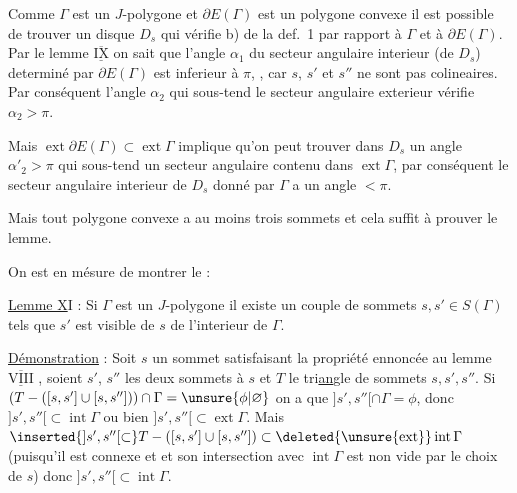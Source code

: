 Comme $\Gamma$ est un $J$-polygone et $\partial E(\Gamma)$ est un polygone convexe il est possible de trouver un disque $D_s$ qui vérifie b) de la def.~1 par rapport à $\Gamma$ et à $\partial E(\Gamma)$. Par le lemme $\underline{\overline{\mathrm{IX}}}$ on sait que l'angle $\alpha_1$ du secteur angulaire interieur (de $D_s$) determiné par $\partial E(\Gamma)$ est inferieur à $\pi$, , car $s$, $s'$ et $s''$ ne sont pas colineaires. Par conséquent l'angle $\alpha_2$ qui sous-tend le secteur angulaire exterieur vérifie $\alpha_2>\pi$.

Mais $\operatorname{ext}\partial E(\Gamma)\subset\operatorname{ext}\Gamma$ implique qu'on peut trouver dans $D_s$ un angle $\alpha'_2>\pi$ qui sous-tend un secteur angulaire contenu dans $\operatorname{ext}\Gamma$, par conséquent le secteur angulaire interieur de $D_s$  donné par $\Gamma$ a un angle $<\pi$.

Mais tout polygone convexe a au moins trois sommets et cela suffit à prouver le lemme.

On est en mésure de montrer le :

\uline{Lemme X}I : Si $\Gamma$ est un $J$-polygone  il existe un couple de sommets $s,s'\in S(\Gamma)$ tels que $s'$ est visible de $s$ de l'interieur de $\Gamma$.


\uline{Démonstration} : Soit $s$ un sommet satisfaisant la propriété ennoncée au lemme $\underline{\overline{\mathrm{VIII}}}$%
, soient $s'$, $s''$ les deux sommets   à $s$ et $T$ le tri\uline{an}gle%
 de sommets $s,s',s''$. Si $(T-([s,s']\cup[s,s'']))\cap\Gamma=\unsure{\phi|\varnothing}$ on a que $]s',s''[\cap\Gamma=\phi$, donc $]s',s''[\subset\operatorname{int}\Gamma$ ou bien $]s',s''[\subset\operatorname{ext}\Gamma$. Mais $\inserted{]s',s''[\subset}T-([s,s']\cup[s,s''])\subset\deleted{\unsure{\operatorname{ext}}}\operatorname{int}\Gamma$ (puisqu'il est connexe et et son intersection avec $\operatorname{int}\Gamma$ est non vide par le choix de $s$) donc $]s',s''[\subset\operatorname{int}\Gamma$.

